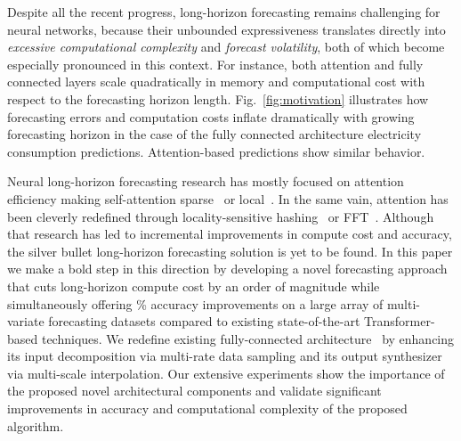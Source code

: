 Despite all the recent progress, long-horizon forecasting remains challenging for neural networks, because their unbounded expressiveness translates directly into \emph{excessive computational complexity} and \emph{forecast volatility}, both of which become especially pronounced in this context. For instance, both attention and fully connected layers scale quadratically in memory and computational cost with respect to the forecasting horizon length. Fig.~\ref{fig:motivation} illustrates how forecasting errors and computation costs inflate dramatically with growing forecasting horizon in the case of the fully connected architecture electricity consumption predictions. Attention-based predictions show similar behavior.

Neural long-horizon forecasting research has mostly focused on attention efficiency making self-attention sparse~\citep{child2019sparse_transformer,li2019logtrans,zhou2021informer} or local~\citep{li2019logtrans}. In the same vain, attention has been cleverly redefined through locality-sensitive hashing~\citep{kitaev2020reformer} or FFT~\citep{wu2021autoformer}. Although that research has led to incremental improvements in compute cost and accuracy, the silver bullet long-horizon forecasting solution is yet to be found. In this paper we make a bold step in this direction by developing a novel forecasting approach that cuts long-horizon compute cost by an order of magnitude while simultaneously offering \multivarMSEgains\% accuracy improvements on a large array of multi-variate forecasting datasets compared to existing state-of-the-art Transformer-based techniques. We redefine existing fully-connected \NBEATS{} architecture~\citep{oreshkin2020nbeats} by enhancing its input decomposition via multi-rate data sampling and its output synthesizer via multi-scale interpolation. Our extensive experiments show the importance of the proposed novel architectural components and validate significant improvements in accuracy and computational complexity of the proposed algorithm. \\

